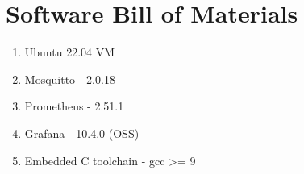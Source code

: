 \section{Software Bill of Materials}

\begin{enumerate}
    \item Ubuntu 22.04 VM
    \item Mosquitto - 2.0.18
    \item Prometheus - 2.51.1
    \item Grafana - 10.4.0 (OSS)
    \item Embedded C toolchain - gcc >= 9
\end{enumerate}
